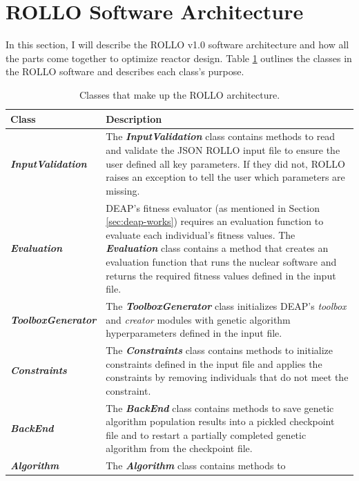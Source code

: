 \section{ROLLO Software Architecture}
In this section, I will describe the \gls{ROLLO} v1.0 software architecture and 
how all the parts come together to optimize reactor design.
Table \ref{tab:rollo-architecture} outlines the classes in the \gls{ROLLO} software 
and describes each class's purpose.
\begin{table}[]
    \centering
    \onehalfspacing
    \caption{Classes that make up the \gls{ROLLO} architecture. }
	\label{tab:rollo-architecture}
    \footnotesize
    \begin{tabular}{l|p{}}
    \hline
    \textbf{Class} & \textbf{Description} \\ \hline
    \textbf{\textit{InputValidation}} & The \textbf{\textit{InputValidation}} class contains methods 
    to read and validate the JSON \gls{ROLLO} input file to 
    ensure the user defined all key parameters. If they did not, \gls{ROLLO} 
    raises an exception to tell the user which parameters are missing. \\
    \hline
    \textbf{\textit{Evaluation}} & \gls{DEAP}'s fitness evaluator (as mentioned in Section 
    \ref{sec:deap-works}) requires an evaluation function to evaluate each 
    individual's fitness values. 
    The \textbf{\textit{Evaluation}} class contains a method that creates an evaluation 
    function that runs the nuclear software and returns the required fitness values
    defined in the input file. \\
    \hline 
    \textbf{\textit{ToolboxGenerator}} & The \textbf{\textit{ToolboxGenerator}} class initializes
    \gls{DEAP}'s \textit{toolbox} and \textit{creator} modules with genetic algorithm 
    hyperparameters defined in the input file.\\
    \hline
    \textbf{\textit{Constraints}} & The \textbf{\textit{Constraints}} class 
    contains methods to initialize constraints defined in the input file 
    and applies the constraints by removing individuals that do not meet the 
    constraint.\\
    \hline 
    \textbf{\textit{BackEnd}} & The \textbf{\textit{BackEnd}} class contains methods to save 
    genetic algorithm population results into a pickled checkpoint file and to 
    restart a partially completed genetic algorithm from the checkpoint file. \\
    \hline
    \textbf{\textit{Algorithm}} & The \textbf{\textit{Algorithm}} class contains methods to 

\end{tabular}
\end{table}
